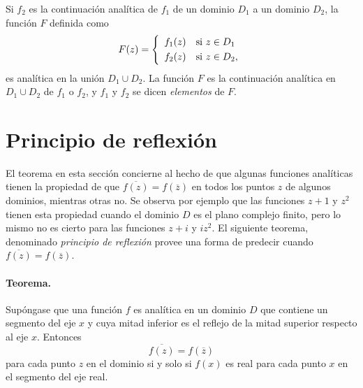 \documentclass[a4paper]{report}
\begin{document}
Si \(f_2\) es la continuación analítica de \(f_1\) de un dominio \(D_1\) a un dominio \(D_2\), la función \(F\) definida como
\[
 F(z)=
 \left\{ 
 \begin{array}{ll}
  f_1(z) & \textrm{si }z\in D_1\\[\smallskipamount]
  f_2(z) & \textrm{si }z\in D_2,
 \end{array}
 \right.
\]
es analítica en la unión \(D_1\cup D_2\). La función \(F\) es la continuación analítica en \(D_1\cup D_2\) de \(f_1\) o \(f_2\), y \(f_1\) y \(f_2\) se dicen \emph{elementos} de \(F\).

\section{Principio de reflexión}\label{sec:reflection_principle}

El teorema en esta sección concierne al hecho de que algunas funciones analíticas tienen la propiedad de que \(\overline{f(z)}=f(\overline{z})\) en todos los puntos \(z\) de algunos dominios, mientras otras no. Se observa por ejemplo que las funciones \(z+1\) y \(z^2\) tienen esta propiedad cuando el dominio \(D\) es el plano complejo finito, pero lo mismo no es cierto para las funciones \(z+i\) y \(iz^2\). El siguiente teorema, denominado \emph{principio de reflexión} provee una forma de predecir cuando \(\overline{f(z)}=f(\overline{z})\). 

\paragraph{Teorema.} Supóngase que una función \(f\) es analítica en un dominio \(D\) que contiene un segmento del eje \(x\) y cuya mitad inferior es el reflejo de la mitad superior respecto al eje \(x\). Entonces 
\begin{equation}\label{eq:reflection_principle}
 \overline{f(z)}=f(\overline{z})
\end{equation}
para cada punto \(z\) en el dominio si y solo si \(f(x)\) es real para cada punto \(x\) en el segmento del eje real.
\end{document}
